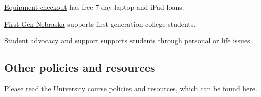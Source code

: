 \documentclass[12pt]{amsart}
\begin{document}
\medskip
\noindent
\href{https://services.unl.edu/service/huskertech-laptop-checkout}{Equipment checkout} has free 7 day laptop and iPad loans.


\medskip
\noindent
\href{https://executivevc.unl.edu/evc/initiatives/first-generation-nebraska}{First Gen Nebraska} supports first generation college students. 

\medskip
\noindent
\href{https://studentadvocacy.unl.edu}{Student advocacy and support} supports students through personal or life issues. 


\subsection*{Other policies and resources}Please read the University course policies and resources, which can be found \href{https://executivevc.unl.edu/academic-excellence/teaching-resources/course-policies}{here}.
\end{document}

